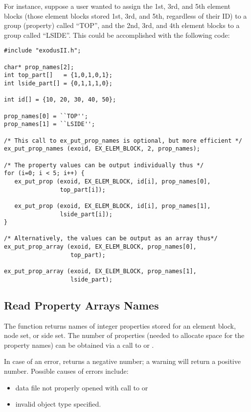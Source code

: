 For instance, suppose a user wanted to assign the 1st, 3rd, and 5th
element blocks (those element blocks stored 1st, 3rd, and 5th,
regardless of their ID) to a group (property) called ``TOP'', and the
2nd, 3rd, and 4th element blocks to a group called ``LSIDE''. This
could be accomplished with the following code:

\begin{lstlisting}
#include "exodusII.h";

char* prop_names[2];
int top_part[]   = {1,0,1,0,1};
int lside_part[] = {0,1,1,1,0};

int id[] = {10, 20, 30, 40, 50};

prop_names[0] = ``TOP'';
prop_names[1] = ``LSIDE'';

/* This call to ex_put_prop_names is optional, but more efficient */
ex_put_prop_names (exoid, EX_ELEM_BLOCK, 2, prop_names);

/* The property values can be output individually thus */
for (i=0; i < 5; i++) {
   ex_put_prop (exoid, EX_ELEM_BLOCK, id[i], prop_names[0],
                top_part[i]);

   ex_put_prop (exoid, EX_ELEM_BLOCK, id[i], prop_names[1],
                lside_part[i]);
}

/* Alternatively, the values can be output as an array thus*/
ex_put_prop_array (exoid, EX_ELEM_BLOCK, prop_names[0],
                   top_part);

ex_put_prop_array (exoid, EX_ELEM_BLOCK, prop_names[1],
                   lside_part);

\end{lstlisting}


\subsection{Read Property Arrays Names}

The function  returns names of integer
properties stored for an element block, node set, or side set. The
number of properties (needed to allocate space for the property names)
can be obtained via a call to  or
.

In case of an error,  returns a negative
number; a warning will return a positive number.  Possible causes of
errors include:

\begin{itemize}
 \item data file not properly opened with call to 
 or 

 \item invalid object type specified.
\end{itemize}

